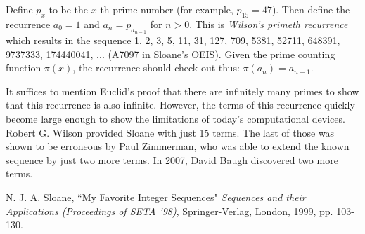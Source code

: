 \documentclass[12pt]{article}
\begin{document}
Define $p_x$ to be the $x$-th prime number (for example, $p_{15} = 47$). Then define the recurrence $a_0 = 1$ and $a_n = p_{a_{n - 1}}$ for $n > 0$. This is {\em Wilson's primeth recurrence} which results in the sequence 1, 2, 3, 5, 11, 31, 127, 709, 5381, 52711, 648391, 9737333, 174440041, ... (A7097 in Sloane's OEIS). Given the prime counting function $\pi(x)$, the recurrence should check out thus: $\pi(a_n) = a_{n - 1}$.

It suffices to mention Euclid's proof that there are infinitely many primes to show that this recurrence is also infinite. However, the terms of this recurrence quickly become large enough to show the limitations of today's computational devices. Robert G. Wilson provided Sloane with just 15 terms. The last of those was shown to be erroneous by Paul Zimmerman, who was able to extend the known sequence by just two more terms. In 2007, David Baugh discovered two more terms.

\begin{thebibliography}{1}
 N. J. A. Sloane, ``My Favorite Integer Sequences" {\it Sequences and their Applications (Proceedings of SETA '98)}, Springer-Verlag, London, 1999, pp. 103-130.
\end{thebibliography}
\end{document}
